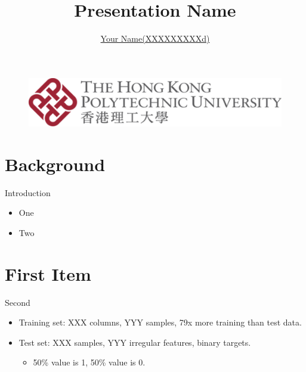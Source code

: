 \documentclass{beamer}
\author{\href{}{Your Name(XXXXXXXXXd)}}
\institute{\href{}{Deparment of Computing, The Hong Kong Polytechnic University}}
\title{Presentation Name}
\subtitle{}
\date{}
\begin{document}
\kaishu
\begin{frame}
    \titlepage
    \begin{figure}[htpb]
        \begin{center}
            \includegraphics[width=0.45\linewidth]{pic/polyu.png}
        \end{center}
    \end{figure}
\end{frame}

\begin{frame}
    \tableofcontents[sectionstyle=show,subsectionstyle=show/shaded/hide,subsubsectionstyle=show/shaded/hide]
\end{frame}


\section{Background}

\begin{frame}{Introduction}

\begin{itemize}
    \item One
    \item Two
    
\end{itemize}

\end{frame}


\section{First Item}
\begin{frame}{Second}

\begin{itemize}
    \item Training set: XXX columns, YYY samples, 79x more training than test data.
    \item Test set: XXX samples, YYY irregular features, binary targets. 
    \begin{itemize}
        \item 50\% value is 1, 50\% value is 0.
    \end{itemize}
\end{itemize}
    
\end{frame}
\end{document}
